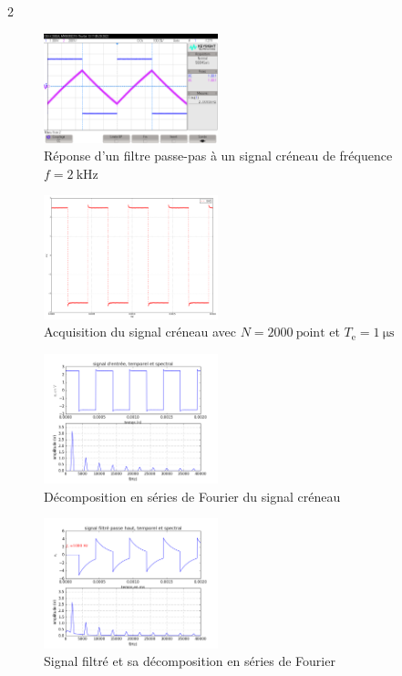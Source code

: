 \documentclass[a4paper]{article}
\begin{document}
\begin{multicols}2
\begin{figure}[H]
	\centering
	\includegraphics[width=0.45\textwidth]{figures/scope_1.png}
	\caption{Réponse d'un filtre passe-pas à un signal créneau de fréquence $f = 2\:\mathrm{kHz}$}
\end{figure}

\begin{figure}[H]
	\centering
	\includegraphics[width=0.45\textwidth]{figures/Capture12.png}
	\caption{Acquisition du signal créneau avec $N = 2000\:\mathrm{point}$\/ et $T_\text{e} = 1\:\mathrm{\mu s}$}
\end{figure}

\begin{figure}[H]
	\centering
	\includegraphics[width=0.45\textwidth]{figures/Capture14.png}
	\caption{Décomposition en séries de {\sc Fourier}\/ du signal créneau}
\end{figure}

\begin{figure}[H]
	\centering
	\includegraphics[width=0.45\textwidth]{figures/Capture15.png}
	\caption{Signal filtré et sa décomposition en séries de {\sc Fourier}\/}
\end{figure}


\end{multicols}
\end{document}
